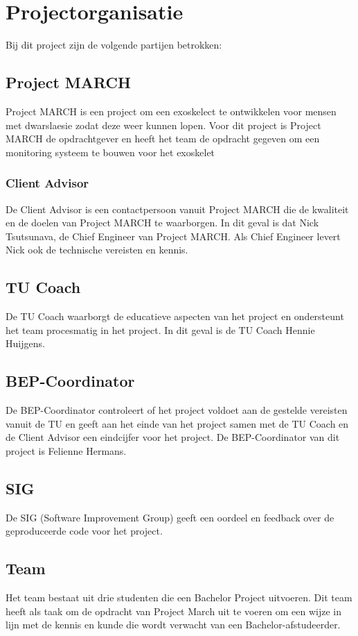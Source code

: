 \section{Projectorganisatie}
Bij dit project zijn de volgende partijen betrokken:

\subsection{Project MARCH}
Project MARCH is een project om een exoskelect te ontwikkelen voor mensen met dwarslaesie zodat deze weer kunnen lopen. Voor dit project is Project MARCH de opdrachtgever en heeft het team de opdracht gegeven om een monitoring systeem te bouwen voor het exoskelet

\subsubsection{Client Advisor}
De Client Advisor is een contactpersoon vanuit Project MARCH die de kwaliteit en de doelen van Project MARCH te waarborgen. In dit geval is dat Nick Tsutsunava, de Chief Engineer van Project MARCH. Als Chief Engineer levert Nick ook de technische vereisten en kennis.

\subsection{TU Coach}
De TU Coach waarborgt de educatieve aspecten van het project en ondersteunt het team procesmatig in het project. In dit geval is de TU Coach Hennie Huijgens. 

\subsection{BEP-Coordinator}
De BEP-Coordinator controleert of het project voldoet aan de gestelde vereisten vanuit de TU en geeft aan het einde van het project samen met de TU Coach en de Client Advisor een eindcijfer voor het project. De BEP-Coordinator van dit project is Felienne Hermans. 

\subsection{SIG}
De SIG (Software Improvement Group) geeft een oordeel en feedback over de geproduceerde code voor het project. 

\subsection{Team}
Het team bestaat uit drie studenten die een Bachelor Project uitvoeren. Dit team heeft als taak om de opdracht van Project March uit te voeren om een wijze in lijn met de kennis en kunde die wordt verwacht van een Bachelor-afstudeerder.